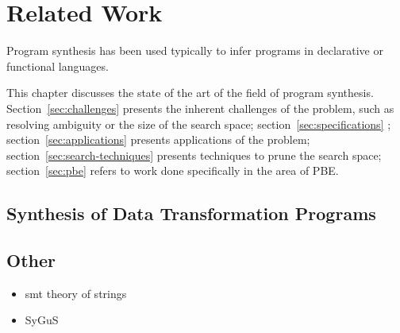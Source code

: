 \chapter{Related Work}
\label{chapter:relatedWork}


Program synthesis has been used typically to infer programs in declarative or
functional languages.

This chapter discusses the state of the art of the field of program synthesis.
Section~\ref{sec:challenges} presents the inherent challenges of the problem,
such as resolving ambiguity or the size of the search space;
section~\ref{sec:specifications} ;
section~\ref{sec:applications}
presents applications of the problem; section~\ref{sec:search-techniques}
presents techniques to prune the search space; section~\ref{sec:pbe} refers to
work done specifically in the area of \ac{PBE}.







\section{Synthesis of Data Transformation Programs}
\label{sec:data-trans-synth}


\section{Other}
\label{sec:other}

\begin{itemize}
\item smt theory of strings
\item SyGuS
\end{itemize}

